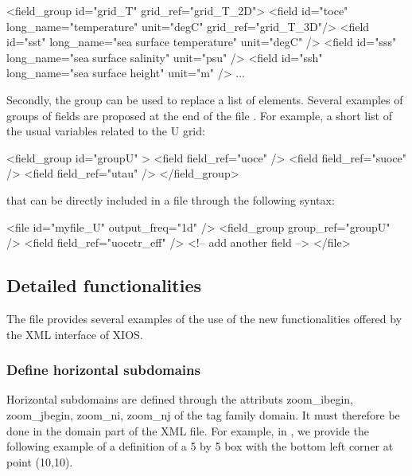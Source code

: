\documentclass[../tex_main/NEMO_manual]{subfiles}
\begin{document}
\begin{xmllines}
<field_group id="grid_T" grid_ref="grid_T_2D">
	<field id="toce" long_name="temperature"             unit="degC" grid_ref="grid_T_3D"/>
	<field id="sst"  long_name="sea surface temperature" unit="degC"                     />
	<field id="sss"  long_name="sea surface salinity"    unit="psu"                      />
	<field id="ssh"  long_name="sea surface height"      unit="m"                        />
	...
\end{xmllines}

Secondly, the group can be used to replace a list of elements.
Several examples of groups of fields are proposed at the end of the file .
For example, a short list of the usual variables related to the U grid:

\begin{xmllines}
<field_group id="groupU" >
	<field field_ref="uoce"  />
	<field field_ref="suoce" />
	<field field_ref="utau"  />
</field_group>
\end{xmllines}

that can be directly included in a file through the following syntax:

\begin{xmllines}
<file id="myfile_U" output_freq="1d" />
	<field_group group_ref="groupU" />
	<field field_ref="uocetr_eff"   />  <!-- add another field -->
</file>   
\end{xmllines}

\subsection{Detailed functionalities}

The file  provides several examples of the use of
the new functionalities offered by the XML interface of XIOS.

\subsubsection{Define horizontal subdomains}

Horizontal subdomains are defined through the attributs zoom\_ibegin, zoom\_jbegin, zoom\_ni, zoom\_nj of
the tag family domain.
It must therefore be done in the domain part of the XML file. 
For example, in , we provide the following example of a definition of 
a 5 by 5 box with the bottom left corner at point (10,10).
\end{document}
